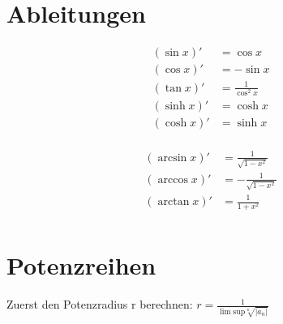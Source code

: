 \documentclass[a4paper,10pt]{article}
\DeclareMathOperator{\arcsinh}{arcsinh}
\DeclareMathOperator{\arccosh}{arccosh}
\DeclareMathOperator{\arctanh}{arctanh}
\begin{document}
\section{Ableitungen}
\begin{table}[ht]
\begin{minipage}[b]{0.5\linewidth}\centering
\begin{align*}
    (\sin x)'    &= \cos x \\
    (\cos x)'    &= -\sin x \\
    (\tan x)'    &= \frac{1}{\cos^2 x} \\
    (\sinh x)'   &= \cosh x \\
    (\cosh x)'   &= \sinh x \\
\end{align*}

\end{minipage}
\hspace{0.5cm}
\begin{minipage}[b]{0.5\linewidth}
\centering

\begin{align*}
    (\arcsin x)'  &=   \frac {1}{\sqrt{1-x^2}} \\
    (\arccos x)'  &= - \frac {1}{\sqrt{1-x^2}} \\
    (\arctan x)'  &=   \frac {1}{1 + x^2} \\
\end{align*}

\end{minipage}
\end{table}

\section{Potenzreihen}
Zuerst den Potenzradius r berechnen:
\(
    r = \frac {1}{\lim \text{sup} \sqrt[n]{|a_n|}}
\)
\end{document}
